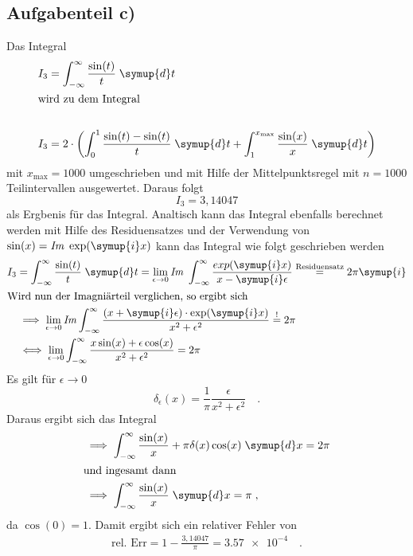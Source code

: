 \subsection*{Aufgabenteil c)}
Das Integral
\begin{align*}
  I_3 &=\int_{-\infty}^{\infty} \frac{\sin(t)}{t} \;\symup{d}t \\
  \intertext{wird zu dem Integral}\\
  I_3 &= 2 \cdot \left( \int_{0}^{1} \frac{\sin(t)-\sin(t)}{t}\;\symup{d}t + \int_{1}^{x_{\text{max}}} \frac{\sin(x)}{x}\;\symup{d}t \right)
\end{align*}
mit $x_{\text{max}}=1000$ umgeschrieben und mit Hilfe der Mittelpunktsregel mit $n=1000$ Teilintervallen ausgewertet.
Daraus folgt
\begin{equation}
  I_3 = 3,14047
\end{equation}
als Ergbenis für das Integral.
Analtisch kann das Integral ebenfalls berechnet werden mit Hilfe des Residuensatzes und der Verwendung von $\sin(x)=\mathit{Im}\; \exp(\symup{i}x)$
kann das Integral wie folgt geschrieben werden
\begin{align*}
  I_3 &=\int_{-\infty}^{\infty} \frac{\sin(t)}{t} \;\symup{d}t = \lim_{\epsilon \to 0} \mathit{Im} \; \int_{-\infty}^{\infty} \frac{exp(\symup{i}x)}{x-\symup{i}\epsilon}
  \overset{\text{Residuensatz}}{=} 2\pi\symup{i} \\
  \intertext{Wird nun der Imagniärteil verglichen, so ergibt sich}
  &\implies \lim_{\epsilon \to 0} \mathit{Im} \int_{-\infty}^{\infty} \frac{(x+\symup{i}\epsilon)\cdot \exp(\symup{i}x)}{x^2+{\epsilon}^2} \overset{!}{=} 2\pi \\
  &\iff \lim_{\epsilon \to 0} \int_{-\infty}^{\infty} \frac{x\sin(x)+\epsilon\cos(x)}{x^2+{\epsilon}^2} = 2\pi
\end{align*}
Es gilt für $\epsilon\to 0$
\begin{equation*}
  \delta_{\epsilon}(x)= \frac{1}{\pi}\frac{\epsilon}{x^2+{\epsilon}^2}\quad .
\end{equation*}
Daraus ergibt sich das Integral
\begin{align*}
  &\implies \int_{-\infty}^{\infty} \frac{\sin(x)}{x} + \pi\delta(x)\cos(x) \;\symup{d}x = 2 \pi \\
  \intertext{und ingesamt dann}
  &\implies \int_{-\infty}^{\infty} \frac{\sin(x)}{x} \;\symup{d}x = \pi\; ,
\end{align*}
da $\cos(0)=1$.
Damit ergibt sich ein relativer Fehler von
\begin{align*}
  \text{rel. Err} = 1-\frac{3,14047}{\pi} = \num{3.57e-4}\quad.
\end{align*}
